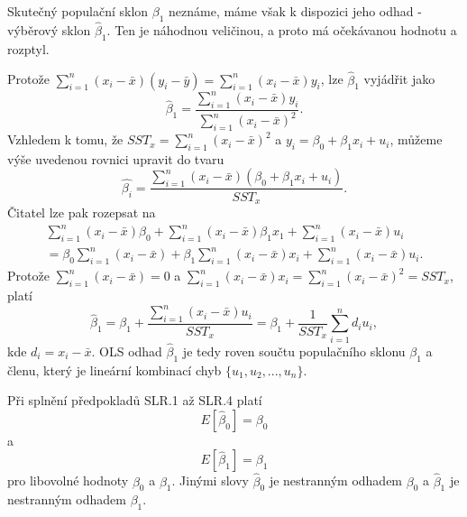 Skutečný populační sklon $\beta_1$ neznáme, máme však k dispozici jeho odhad - výběrový sklon 
$\hat{\beta}_1$. Ten je náhodnou veličinou, a proto má očekávanou hodnotu a rozptyl.

Protože $\sum_{i = 1}^n (x_i - \bar{x})(y_i - \bar{y}) = \sum_{i = 1}^n (x_i - \bar{x})y_i$, lze $\hat{\beta}_1$ vyjádřit jako
\begin{equation}
\hat{\beta}_1 = \frac{\sum_{i = 1}^n (x_i - \bar{x})y_i}{\sum_{i = 1}^n (x_i - \bar{x})^2}.
\end{equation}
Vzhledem k tomu, že $SST_x = \sum_{i = 1}^n (x_i - \bar{x})^2$ a $y_i = \beta_0 + \beta_1 x_i + u_i$, můžeme výše 
uvedenou rovnici upravit do tvaru
\begin{equation}
\hat{\beta_i} = \frac{\sum_{i = 1}^n (x_i - \bar{x})(\beta_0 + \beta_1 x_i + u_i)}{SST_x}.
\end{equation}
Čitatel lze pak rozepsat na
\begin{multline}
\sum_{i = 1}^n (x_i - \bar{x})\beta_0 + \sum_{i = 1}^n (x_i - \bar{x})\beta_1 x_1 + \sum_{i = 1}^n (x_i - \bar{x}) 
u_i\\
= \beta_0 \sum_{i = 1}^n (x_i - \bar{x})  +\beta_1 \sum_{i = 1}^n (x_i - \bar{x})x_i + \sum_{i = 1}^n (x_i - \bar{x}) 
u_i.
\end{multline}
Protože $\sum_{i = 1}^n (x_i - \bar{x}) = 0$ a $\sum_{i = 1}^n (x_i - \bar{x})x_i = \sum_{i = 1}^n (x_i - \bar{x})^2 = 
SST_x$, platí
\begin{equation}
\hat{\beta}_1 = \beta_1 + \frac{\sum_{i = 1}^n (x_i - \bar{x})u_i}{SST_x} = \beta_1 + \frac{1}{SST_x}\sum_{i = 1}^n d_i 
u_i,
\end{equation}
kde $d_i = x_i - \bar{x}$. OLS odhad $\hat{\beta}_1$ je tedy roven součtu populačního sklonu $\beta_1$ a členu, který je 
lineární kombinací chyb $\{u_1, u_2, ..., u_n\}$.

\begin{theorem}
Při splnění předpokladů SLR.1 až SLR.4 platí
\begin{equation}
E[\hat{\beta}_0] = \beta_0
\end{equation}
a
\begin{equation}
E[\hat{\beta}_1] = \beta_1
\end{equation}
pro libovolné hodnoty $\beta_0$ a $\beta_1$. Jinými slovy $\hat{\beta}_0$ je nestranným odhadem $\beta_0$ a 
$\hat{\beta}_1$ je nestranným odhadem $\beta_1$.

\raggedleft{$\clubsuit$}
\end{theorem}

